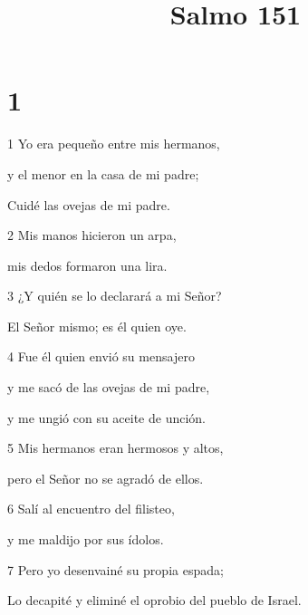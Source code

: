 

\title{Salmo 151}

\chapter{1}

\par 1 Yo era pequeño entre mis hermanos,
\par     y el menor en la casa de mi padre;
\par     Cuidé las ovejas de mi padre.
\par 2 Mis manos hicieron un arpa,
\par     mis dedos formaron una lira.
\par 3 ¿Y quién se lo declarará a mi Señor?
\par     El Señor mismo; es él quien oye.
\par 4 Fue él quien envió su mensajero
\par     y me sacó de las ovejas de mi padre,
\par     y me ungió con su aceite de unción.
\par 5 Mis hermanos eran hermosos y altos,
\par     pero el Señor no se agradó de ellos.
\par 6 Salí al encuentro del filisteo,
\par     y me maldijo por sus ídolos.
\par 7 Pero yo desenvainé su propia espada;
\par     Lo decapité y eliminé el oprobio del pueblo de Israel.

